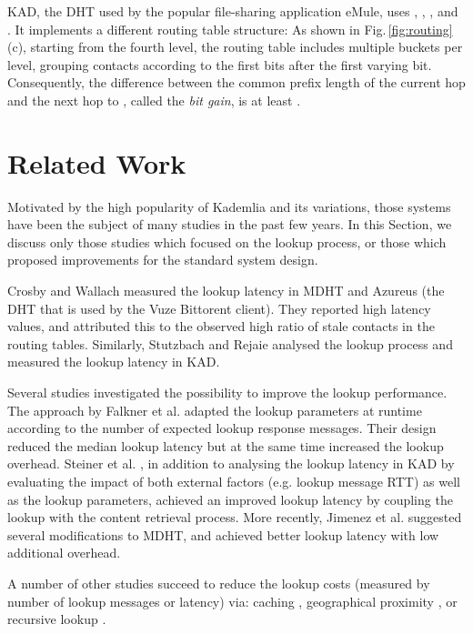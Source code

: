\documentclass[10pt, conference, compsocconf, letterpaper]{IEEEtran}
\begin{document}
KAD, the DHT used by the popular file-sharing application eMule, uses  , , , and . It implements a different routing table structure: As shown in Fig.\,\ref{fig:routing}(c), starting from the fourth level, the routing table includes multiple buckets per level, grouping contacts according to the first  bits after the first varying bit. Consequently, the difference between the common prefix length of the current hop and the next hop to , called the \emph{bit gain}, is at least .



\section{Related Work} \label{sec:related}

Motivated by the high popularity of Kademlia and its variations, those systems have been the subject of many studies in the past few years. In this Section, we discuss only those studies which focused on the lookup process, or those which proposed improvements for the standard system design.

Crosby and Wallach \cite{crosby07analysis} measured the lookup latency in MDHT and Azureus (the DHT that is used by the Vuze Bittorent client). They reported high latency values, and attributed this to the observed high ratio of stale contacts in the routing tables. 
Similarly, Stutzbach and Rejaie \cite{stutzbach06improving} analysed the lookup process and measured the lookup latency in KAD. 

Several studies investigated the possibility to improve the lookup performance. The approach by Falkner et al. \cite{falkner07profiling} adapted the lookup parameters at runtime according to the number of expected lookup response messages. Their design reduced the median lookup latency but at the same time increased the lookup overhead. Steiner et al. \cite{steiner10evaluating}, in addition to analysing the lookup latency in KAD by evaluating the impact of both external factors (e.g. lookup message RTT) as well as the lookup parameters, achieved an improved lookup latency by coupling the lookup with the content retrieval process.  More recently, Jimenez et al. \cite{Jimenez2011subsecond} suggested several modifications to MDHT, and achieved better lookup latency with low additional overhead. 

A number of other studies succeed to reduce the lookup costs (measured by number of lookup messages or latency) via: caching \cite{einziger13kaleidoscope, wang06dicas}, geographical proximity \cite{kaune08embracing, castro02exploiting}, or recursive lookup \cite{heep10r}. 
\end{document}
